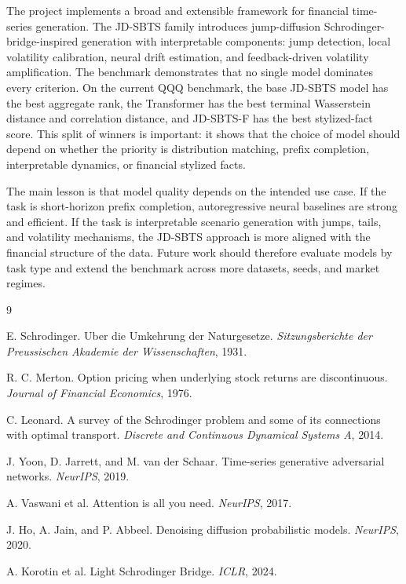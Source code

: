 \documentclass[11pt,a4paper]{article}
\begin{document}
The project implements a broad and extensible framework for financial
time-series generation. The JD-SBTS family introduces jump-diffusion
Schrodinger-bridge-inspired generation with interpretable components: jump
detection, local volatility calibration, neural drift estimation, and
feedback-driven volatility amplification. The benchmark demonstrates that no
single model dominates every criterion. On the current QQQ benchmark, the base
JD-SBTS model has the best aggregate rank, the Transformer has the best terminal
Wasserstein distance and correlation distance, and JD-SBTS-F has the best
stylized-fact score. This split of winners is important: it shows that the
choice of model should depend on whether the priority is distribution matching,
prefix completion, interpretable dynamics, or financial stylized facts.

The main lesson is that model quality depends on the intended use case. If the
task is short-horizon prefix completion, autoregressive neural baselines are
strong and efficient. If the task is interpretable scenario generation with
jumps, tails, and volatility mechanisms, the JD-SBTS approach is more aligned
with the financial structure of the data. Future work should therefore evaluate
models by task type and extend the benchmark across more datasets, seeds, and
market regimes.

\begin{thebibliography}{9}

E. Schrodinger.
\newblock Uber die Umkehrung der Naturgesetze.
\newblock \emph{Sitzungsberichte der Preussischen Akademie der Wissenschaften},
1931.

R. C. Merton.
\newblock Option pricing when underlying stock returns are discontinuous.
\newblock \emph{Journal of Financial Economics}, 1976.

C. Leonard.
\newblock A survey of the Schrodinger problem and some of its connections with
optimal transport.
\newblock \emph{Discrete and Continuous Dynamical Systems A}, 2014.

J. Yoon, D. Jarrett, and M. van der Schaar.
\newblock Time-series generative adversarial networks.
\newblock \emph{NeurIPS}, 2019.

A. Vaswani et al.
\newblock Attention is all you need.
\newblock \emph{NeurIPS}, 2017.

J. Ho, A. Jain, and P. Abbeel.
\newblock Denoising diffusion probabilistic models.
\newblock \emph{NeurIPS}, 2020.

A. Korotin et al.
\newblock Light Schrodinger Bridge.
\newblock \emph{ICLR}, 2024.

\end{thebibliography}
\end{document}
